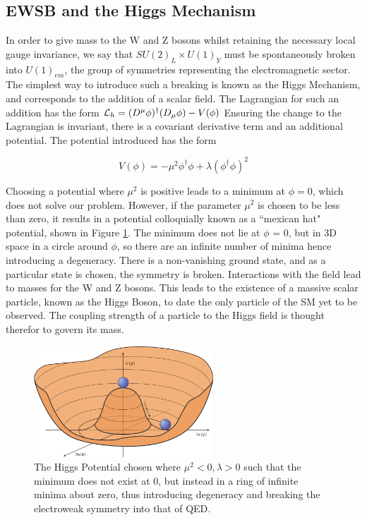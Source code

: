\subsection{EWSB and the Higgs Mechanism}

In order to give mass to the W and Z bosons whilst retaining the necessary local gauge invariance, we say that $SU(2)_{L} \times U(1)_{Y}$ must be spontaneously broken into $U(1)_{em}$, the group of symmetries representing the electromagnetic sector. The simplest way to introduce such a breaking is known as the Higgs Mechanism, and corresponds to the addition of a scalar field. The Lagrangian for such an addition has the form ${\mathcal{L}}_{h} = (D^{\mu}\phi)^{\dagger}(D_{\mu}\phi) - V(\phi)$  Ensuring the change to the Lagrangian is invariant, there is a covariant derivative term and an additional potential. The potential introduced has the form 

\begin{equation}
V(\phi) = -\mu^{2}\phi^{\dagger}\phi + \lambda (\phi^{\dagger}\phi)^{2}
\end{equation}

Choosing a potential where $\mu^{2}$ is positive leads to a minimum at $\phi = 0$, which does not solve our problem. However, if the parameter $\mu^{2}$ is chosen to be less than zero, it results in a potential colloquially known as a ``mexican hat" potential, shown in Figure \ref{fig:MexicanHat}. The minimum does not lie at $\phi$ = 0, but in 3D space in a circle around $\phi$, so there are an infinite number of minima hence introducing a degeneracy. There is a non-vanishing ground state, and as a particular state is chosen, the symmetry is broken. Interactions with the field lead to masses for the W and Z bosons. This leads to the existence of a massive scalar particle, known as the Higgs Boson, to date the only particle of the SM yet to be observed. The coupling strength of a particle to the Higgs field is thought therefor to govern its mass.

\begin{figure}
\centering
\includegraphics[width=0.6\textwidth]{Figures/Theory/MHat}
\caption{\label{fig:MexicanHat}The Higgs Potential chosen where $\mu^{2} < 0, \lambda > 0$ such that the minimum does not exist at 0, but instead in a ring of infinite minima about zero, thus introducing degeneracy and breaking the electroweak symmetry into that of QED.~\cite{MexHat}}
\end{figure}

